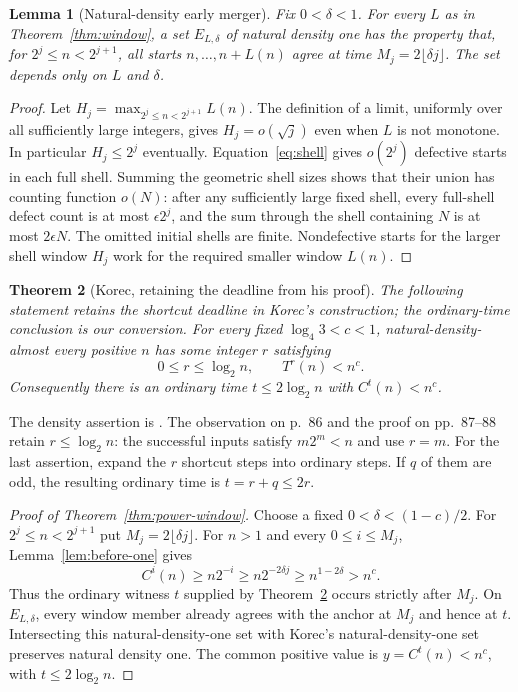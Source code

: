 \documentclass[11pt]{amsart}
\newtheorem{theorem}{Theorem}[section]
\newtheorem{lemma}[theorem]{Lemma}
\theoremstyle{definition}
\theoremstyle{remark}
\begin{document}
\begin{lemma}[Natural-density early merger]\label{lem:early}
Fix $0<\delta<1$. For every $L$ as in Theorem~\ref{thm:window}, a set $E_{L,\delta}$ of natural density one has the property that, for $2^j\le n<2^{j+1}$, all starts $n,\ldots,n+L(n)$ agree at time $M_j=2\lfloor\delta j\rfloor$. The set depends only on $L$ and $\delta$.
\end{lemma}
\begin{proof}
Let $H_j=\max_{2^j\le n<2^{j+1}}L(n)$. The definition of a limit, uniformly over all sufficiently large integers, gives $H_j=o(\sqrt j)$ even when $L$ is not monotone. In particular $H_j\le2^j$ eventually. Equation~\eqref{eq:shell} gives $o(2^j)$ defective starts in each full shell. Summing the geometric shell sizes shows that their union has counting function $o(N)$: after any sufficiently large fixed shell, every full-shell defect count is at most $\epsilon2^j$, and the sum through the shell containing $N$ is at most $2\epsilon N$. The omitted initial shells are finite. Nondefective starts for the larger shell window $H_j$ work for the required smaller window $L(n)$.
\end{proof}

\begin{theorem}[Korec, retaining the deadline from his proof]\label{thm:korec}
The following statement retains the shortcut deadline in Korec's construction; the ordinary-time conclusion is our conversion.
For every fixed $\log_4 3<c<1$, natural-density-almost every positive $n$ has some integer $r$ satisfying
\[
 0\le r\le\log_2 n,\qquad T^r(n)<n^c.
\]
Consequently there is an ordinary time $t\le2\log_2 n$ with $C^t(n)<n^c$.
\end{theorem}
The density assertion is \cite[Theorem~1]{Korec1994}. The observation on p.~86 and the proof on pp.~87--88 retain $r\le\log_2 n$: the successful inputs satisfy $m2^m<n$ and use $r=m$.
For the last assertion, expand the $r$ shortcut steps into ordinary steps. If $q$ of them are odd, the resulting ordinary time is $t=r+q\le2r$.

\begin{proof}[Proof of Theorem~\ref{thm:power-window}]
Choose a fixed $0<\delta<(1-c)/2$. For $2^j\le n<2^{j+1}$ put $M_j=2\lfloor\delta j\rfloor$.
For $n>1$ and every $0\le i\le M_j$, Lemma~\ref{lem:before-one} gives
\[
 C^i(n)\ge n2^{-i}\ge n2^{-2\delta j}
 \ge n^{1-2\delta}>n^c.
\]
Thus the ordinary witness $t$ supplied by Theorem~\ref{thm:korec} occurs strictly after $M_j$.
On $E_{L,\delta}$, every window member already agrees with the anchor at $M_j$ and hence at $t$.
Intersecting this natural-density-one set with Korec's natural-density-one set preserves natural density one. The common positive value is $y=C^t(n)<n^c$, with $t\le2\log_2 n$.
\end{proof}
\end{document}
